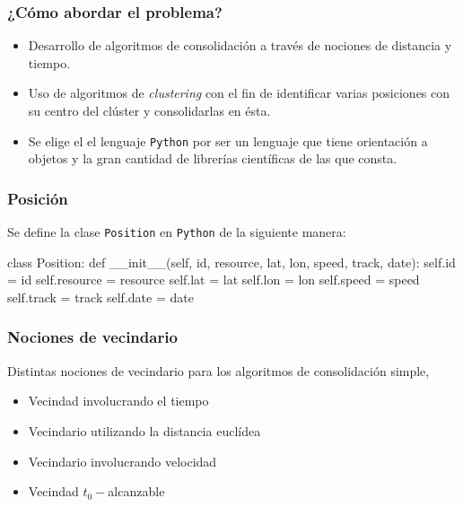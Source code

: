 \documentclass[10pt, spanish]{beamer}
\begin{document}
\begin{frame}[fragile]
\frametitle{¿C\'omo abordar el problema?}
\begin{itemize}

\item Desarrollo de algoritmos de consolidaci\'on a trav\'es de nociones de distancia y tiempo.

\item Uso de algoritmos de \textit{clustering} con el fin de identificar varias posiciones con su centro del cl\'uster y consolidarlas en \'esta.

\item Se elige el el lenguaje \texttt{Python} por ser un lenguaje que tiene orientaci\'on a objetos y la gran cantidad de librer\'ias cient\'ificas de las que consta.

\end{itemize}
\end{frame}


\begin{frame}[fragile]
\frametitle{Posici\'on}
Se define la clase \texttt{Position} en \texttt{Python} de la siguiente manera:\\
\bigskip
\begin{python}
class Position:
    def __init__(self, id, resource, lat, lon, speed, track, date):
        self.id = id
        self.resource = resource
        self.lat = lat
        self.lon = lon
        self.speed = speed
        self.track = track
        self.date = date
\end{python}
\end{frame}


\begin{frame}[fragile]
\frametitle{Nociones de vecindario}

Distintas nociones de vecindario para los algoritmos de consolidaci\'on simple,
\begin{itemize}
	\item Vecindad involucrando el tiempo
	\item Vecindario utilizando la distancia eucl\'idea
	\item Vecindario involucrando velocidad
	\item Vecindad $t_0-$alcanzable
\end{itemize}
\end{frame}
\end{document}
